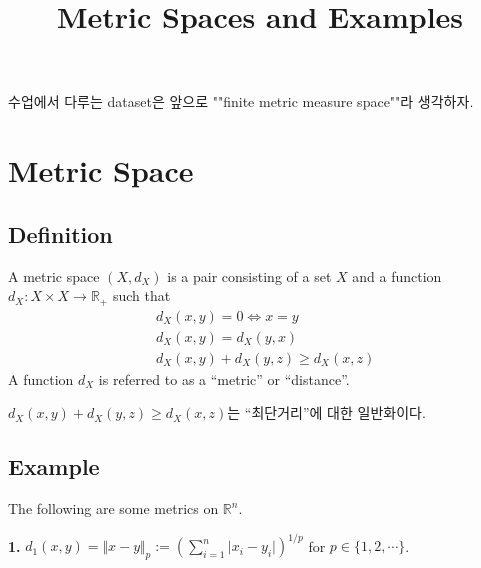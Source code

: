 \documentclass[12pt]{article}
\title{Metric Spaces and Examples}
\author{}
\date{}
\begin{document}
\maketitle

수업에서 다루는 dataset은 앞으로 ""finite metric measure space""라 생각하자.

\section*{Metric Space}

\subsection*{Definition}

\begin{tcolorbox}[colback=gray!5!white, colframe=gray!75!black, title=Definition]
A metric space $(X, d_X)$ is a pair consisting of a set $X$ and a function $d_X : X \times X \to \mathbb{R}_+$ such that
\[
\begin{aligned}
    & d_X(x, y) = 0 \iff x = y \\
    & d_X(x, y) = d_X(y, x) \\
    & d_X(x, y) + d_X(y, z) \ge d_X(x, z)
\end{aligned}
\]
A function $d_X$ is referred to as a ``metric'' or ``distance''.
\end{tcolorbox}

$d_X(x, y) + d_X(y, z) \ge d_X(x, z)$는 ``최단거리''에 대한 일반화이다.

\subsection*{Example}

\begin{tcolorbox}[colback=gray!5!white, colframe=gray!75!black, title=Example]
The following are some metrics on $\mathbb{R}^n$.

\textbf{1.} $d_1(x, y) = \Vert x - y \Vert_p := \left( \sum_{i=1}^n \vert x_i - y_i \vert \right)^{1/p}$ for $p \in \{1, 2, \cdots\}$.
\end{tcolorbox}
\end{document}
